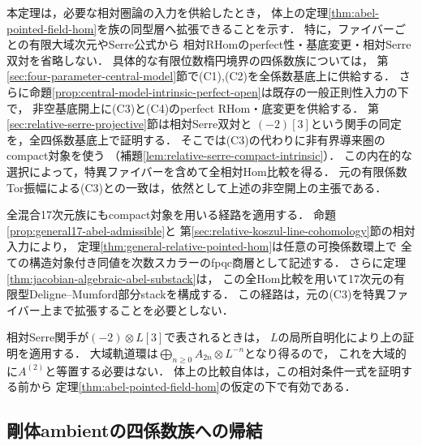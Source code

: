 \begin{remark}[相対比較の入力と全Jacobian族への拡張]
\label{rem:abel-relative-pointed-scope}
本定理は，必要な相対圏論の入力を供給したとき，
体上の定理\ref{thm:abel-pointed-field-hom}を族の同型層へ拡張できることを示す．
特に，ファイバーごとの有限大域次元やSerre公式から
相対RHomのperfect性・基底変更・相対Serre双対を省略しない．
具体的な有限位数楕円境界の四係数族については，
第\ref{sec:four-parameter-central-model}節で\textup{(C1),(C2)}を全係数基底上に供給する．
さらに命題\ref{prop:central-model-intrinsic-perfect-open}は既存の一般正則性入力の下で，
非空基底開上に\textup{(C3)}と\textup{(C4)}のperfect RHom・底変更を供給する．
第\ref{sec:relative-serre-projective}節は相対Serre双対と
$(-2)[3]$という関手の同定を，全四係数基底上で証明する．
そこでは\textup{(C3)}の代わりに非有界導来圏のcompact対象を使う
（補題\ref{lem:relative-serre-compact-intrinsic}）．
この内在的な選択によって，特異ファイバーを含めて全相対Hom比較を得る．
元の有限係数Tor振幅による\textup{(C3)}との一致は，依然として上述の非空開上の主張である．

全混合17次元族にもcompact対象を用いる経路を適用する．
命題\ref{prop:general17-abel-admissible}と
第\ref{sec:relative-koszul-line-cohomology}節の相対入力により，
定理\ref{thm:general-relative-pointed-hom}は任意の可換係数環上で
全ての構造対象付き同値を次数スカラーのfpqc商層として記述する．
さらに定理\ref{thm:jacobian-algebraic-abel-substack}は，
この全Hom比較を用いて17次元の有限型Deligne--Mumford部分stackを構成する．
この経路は，元の\textup{(C3)}を特異ファイバー上まで拡張することを必要としない．

相対Serre関手が$(-2)\otimes L[3]$で表されるときは，
$L$の局所自明化により上の証明を適用する．
大域軌道環は$\bigoplus_{n\ge0}A_{2n}\otimes L^{-n}$となり得るので，
これを大域的に$A^{(2)}$と等置する必要はない．
体上の比較自体は，この相対条件一式を証明する前から
定理\ref{thm:abel-pointed-field-hom}の仮定の下で有効である．
\end{remark}

\subsection{剛体ambientの四係数族への帰結}
\label{subsec:abel-rigid-four-parameters}


